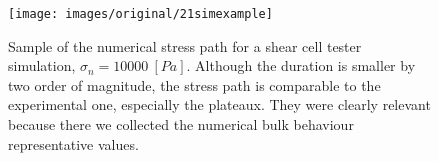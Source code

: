 \begin{figure}[!htb] 
\centering 
\texttt{[image: images/original/21simexample]} 
\caption[Numerical stress path]{Sample of the numerical
stress path for a shear cell tester simulation, $\sigma_n = 10000 ~[Pa]$.
Although the duration is smaller by two order of magnitude, the stress path is comparable to the experimental one, especially the plateaux.
They were clearly relevant because there we collected the numerical bulk
behaviour representative values.}
\label{fig:21simexample} 
\end{figure}


